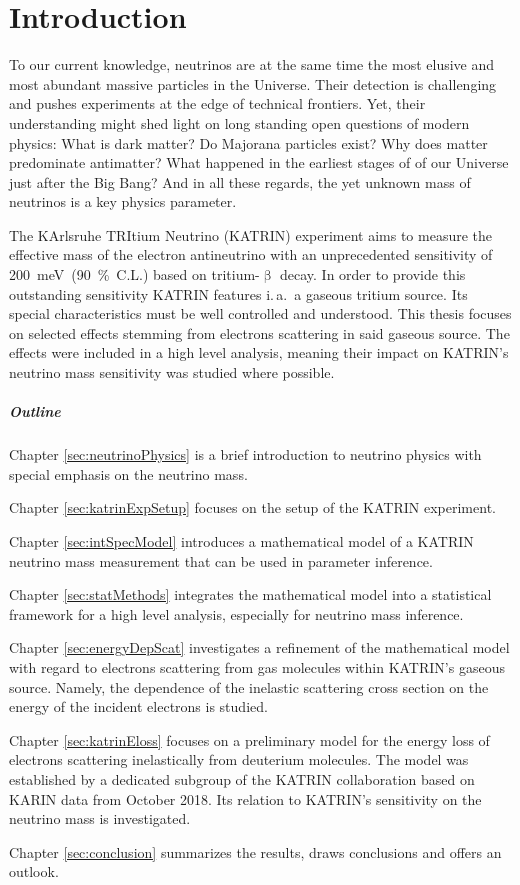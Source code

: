 \chapter{Introduction}
To our current knowledge, neutrinos are at the same time the most elusive and most abundant massive particles in the Universe. Their detection is challenging and pushes experiments at the edge of technical frontiers. Yet, their understanding might shed light on long standing open questions of modern physics: What is dark matter? Do Majorana particles exist? Why does matter predominate antimatter? What happened in the earliest stages of of our Universe just after the Big Bang? And in all these regards, the yet unknown mass of neutrinos is a key physics parameter.

The KArlsruhe TRItium Neutrino (KATRIN) experiment aims to measure the effective mass of the electron antineutrino with an unprecedented sensitivity of \mbox{\SI{200}{meV} (\SI{90}{\percent} C.L.)} based on tritium-$\upbeta$ decay. In order to provide this outstanding sensitivity KATRIN features i.\,a.~a gaseous tritium source. Its special characteristics must be well controlled and understood. This thesis focuses on selected effects stemming from electrons scattering in said gaseous source. The effects were included in a high level analysis, meaning their impact on KATRIN's neutrino mass sensitivity was studied where possible.

\paragraph{Outline}
Chapter \ref{sec:neutrinoPhysics} is a brief introduction to neutrino physics with special emphasis on the neutrino mass.

Chapter \ref{sec:katrinExpSetup} focuses on the setup of the KATRIN experiment.


Chapter \ref{sec:intSpecModel} introduces a mathematical model of a KATRIN neutrino mass measurement that can be used in parameter inference.

Chapter \ref{sec:statMethods} integrates the mathematical model into a statistical framework for a high level analysis, especially for neutrino mass inference.

Chapter \ref{sec:energyDepScat} investigates a refinement of the mathematical model with regard to electrons scattering from gas molecules within KATRIN's gaseous source. Namely, the dependence of the inelastic scattering cross section on the energy of the incident electrons is studied.

Chapter \ref{sec:katrinEloss} focuses on a preliminary model for the energy loss of electrons scattering inelastically from deuterium molecules. The model was established by a dedicated subgroup of the KATRIN collaboration based on KARIN data from October 2018. Its relation to KATRIN's sensitivity on the neutrino mass is investigated.

Chapter \ref{sec:conclusion} summarizes the results, draws conclusions and offers an outlook.